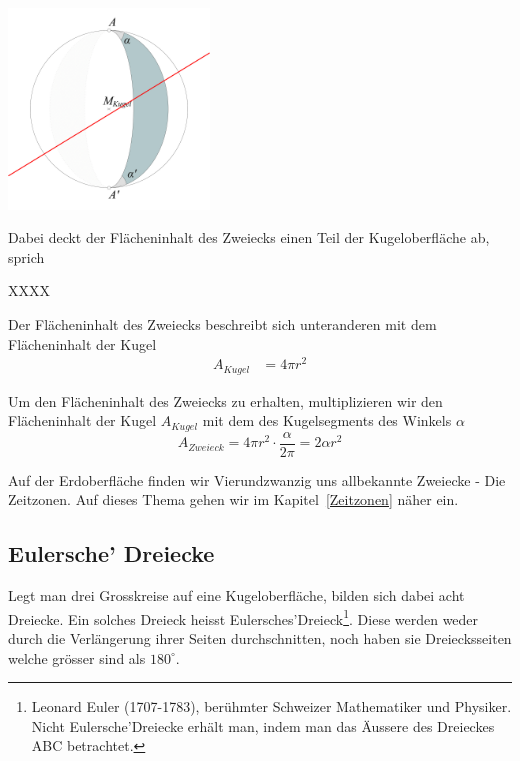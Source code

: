 \begin{refsection}
\begin{center}
        \includegraphics[width=0.4\textwidth]{kugel/Zweieck.jpg}
\end{center}

Dabei deckt der Flächeninhalt des Zweiecks einen Teil der Kugeloberfläche ab, sprich

XXXX

Der Flächeninhalt des Zweiecks beschreibt sich unteranderen mit dem Flächeninhalt der Kugel
\begin{align*}
A_{ Kugel } &= 4 \pi r^{2}
\end{align*}

Um den Flächeninhalt des Zweiecks zu erhalten, multiplizieren wir den Flächeninhalt der Kugel $A_{ Kugel }$ mit dem des Kugelsegments des Winkels $\alpha$ 
\begin{equation}
A_{ Zweieck } = 4 \pi r^{2} \cdot \frac{ \alpha }{ 2 \pi } = 2 \alpha r^{2}
\end{equation}

Auf der Erdoberfläche finden wir Vierundzwanzig uns allbekannte Zweiecke - Die Zeitzonen. Auf dieses Thema gehen wir im Kapitel~\ref{Zeitzonen}  näher ein.


\subsection{Eulersche’ Dreiecke} \label{Euler} 
Legt man drei Grosskreise auf eine Kugeloberfläche, bilden sich dabei acht Dreiecke. 
Ein solches Dreieck heisst Eulersches’Dreieck\footnote{%
Leonard Euler (1707-1783), berühmter Schweizer Mathematiker und Physiker. 
Nicht Eulersche’Dreiecke erhält man, indem man das Äussere des Dreieckes ABC betrachtet.}.
Diese werden weder durch die Verlängerung ihrer Seiten durchschnitten, 
noch haben sie Dreiecksseiten welche grösser sind als $180^{\circ}$.


\end{refsection}
